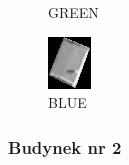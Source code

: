 \documentclass[a4paper,12pt]{article}  %
\begin{document}
\begin{figure}[H]
\begin{minipage}{0.24\textwidth}
        \caption*{GREEN}
    \end{minipage}
    \begin{minipage}{0.24\textwidth}
        \centering
        \includegraphics[width=\linewidth]{spektralne/blue_budynek0.png}
        \caption*{BLUE}
    \end{minipage}
\end{figure}

\subsubsection{Budynek nr 2}
\end{document}
